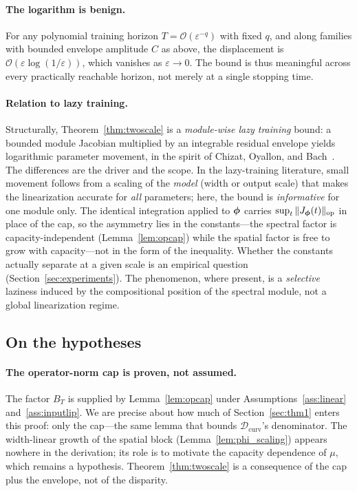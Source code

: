 \paragraph{The logarithm is benign.}
For any polynomial training horizon $T = \mathcal{O}(\varepsilon^{-q})$
with fixed $q$, and along families with bounded envelope amplitude
$C$ as above, the displacement is
$\mathcal{O}(\varepsilon \log(1/\varepsilon))$, which vanishes as
$\varepsilon \to 0$. The bound is thus meaningful across every
practically reachable horizon, not merely at a single stopping time.

\paragraph{Relation to lazy training.}
Structurally, Theorem~\ref{thm:twoscale} is a \emph{module-wise lazy
training} bound: a bounded module Jacobian multiplied by an
integrable residual envelope yields logarithmic parameter movement,
in the spirit of Chizat, Oyallon, and
Bach~\cite{chizat2019lazy}. The differences are the driver and the
scope. In the lazy-training literature, small movement follows from
a scaling of the \emph{model} (width or output scale) that makes the
linearization accurate for \emph{all} parameters; here, the bound
is \emph{informative} for one module only. The identical
integration applied to ${\boldsymbol{\phi}}$ carries
$\sup_t \|J_{\boldsymbol{\phi}}(t)\|_{\mathrm{op}}$ in place of the cap, so the
asymmetry lies in the constants---the spectral factor is
capacity-independent (Lemma~\ref{lem:opcap}) while the spatial
factor is free to grow with capacity---not in the form of the
inequality. Whether the constants actually separate at a given
scale is an empirical question (Section~\ref{sec:experiments}).
The phenomenon, where present, is a \emph{selective} laziness
induced by the compositional position of the spectral module, not
a global linearization regime.

\subsection{On the hypotheses}
\label{sec:thm2_hypotheses}

\paragraph{The operator-norm cap is proven, not assumed.}
The factor $B_T$ is supplied by Lemma~\ref{lem:opcap} under
Assumptions~\ref{ass:linear} and~\ref{ass:inputlip}. We are precise
about how much of Section~\ref{sec:thm1} enters this proof: only
the cap---the same lemma that bounds
$\mathcal{D}_{\mathrm{curv}}$'s denominator. The width-linear
growth of the spatial block (Lemma~\ref{lem:phi_scaling}) appears
nowhere in the derivation; its role is to motivate the capacity
dependence of $\mu$, which remains a hypothesis.
Theorem~\ref{thm:twoscale} is a consequence of the cap plus the
envelope, not of the disparity.

